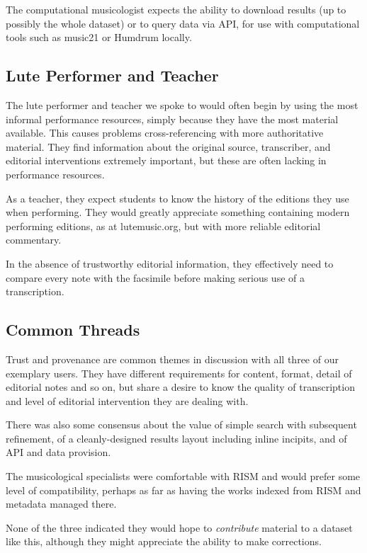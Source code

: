 \documentclass[sigconf, nonacm=true]{acmart}
\begin{document}
\begin{sloppypar}
  The computational musicologist expects the ability to download
  results (up to possibly the whole dataset) or to query data via API,
  for use with computational tools such as music21 or Humdrum locally.
  
  \subsection{Lute Performer and Teacher}

  The lute performer and teacher we spoke to would often begin by
  using the most informal performance resources, simply because they
  have the most material available. This causes problems
  cross-referencing with more authoritative material. They find
  information about the original source, transcriber, and editorial
  interventions extremely important, but these are often lacking in
  performance resources.
  
  As a teacher, they expect students to know the history of the
  editions they use when performing. They would greatly appreciate
  something containing modern performing editions, as at
  lutemusic.org, but with more reliable editorial commentary.
      
  In the absence of trustworthy editorial information, they
  effectively need to compare every note with the facsimile before
  making serious use of a transcription.

  \subsection{Common Threads}

  Trust and provenance are common themes in discussion with all three
  of our exemplary users. They have different requirements for
  content, format, detail of editorial notes and so on, but share a
  desire to know the quality of transcription and level of editorial
  intervention they are dealing with.

  There was also some consensus about the value of simple search with
  subsequent refinement, of a cleanly-designed results layout
  including inline incipits, and of API and data provision.
  
  The musicological specialists were comfortable with RISM and would
  prefer some level of compatibility, perhaps as far as having the
  works indexed from RISM and metadata managed there.

  None of the three indicated they would hope to {\em contribute}
  material to a dataset like this, although they might appreciate the
  ability to make corrections.


\end{sloppypar}
\end{document}
